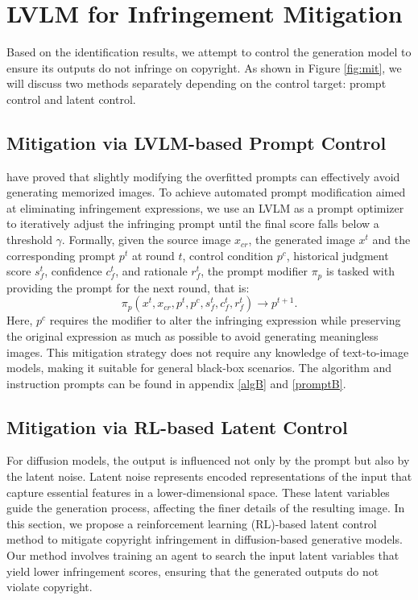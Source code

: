 \section{LVLM for Infringement Mitigation}
\label{mitigation}

Based on the identification results, we attempt to control the generation model to ensure its outputs do not infringe on copyright. As shown in Figure \ref{fig:mit}, we will discuss two methods separately depending on the control target: prompt control and latent control.
\subsection{Mitigation via LVLM-based Prompt Control}
\citeauthor{wen2024detecting} have proved that slightly modifying the overfitted prompts can effectively avoid generating memorized images. To achieve automated prompt modification aimed at eliminating infringement expressions, we use an LVLM as a prompt optimizer to iteratively adjust the infringing prompt until the final score falls below a threshold $\gamma$. Formally, given the source image $x_{{cr}}$, the generated image $x^t$ and the corresponding prompt $p^t$ at round $t$, control condition $p^c$, historical judgment score $s^t_{f}$, confidence $c^t_{f}$, and rationale $r^t_{f}$, the prompt modifier $\pi_{p}$ is tasked with providing the prompt for the next round, that is: 
\begin{equation}
\pi_{p}(x^t, x_{{cr}}, p^t, p^c, s^t_{f}, c^t_{f}, r^t_{f}) \to p^{t+1}.
\end{equation}
Here, $p^c$ requires the modifier to alter the infringing expression while preserving the original expression as much as possible to avoid generating meaningless images. This mitigation strategy does not require any knowledge of text-to-image models, making it suitable for general black-box scenarios. The algorithm and instruction prompts can be found in appendix \ref{algB} and \ref{promptB}.

\subsection{Mitigation via RL-based Latent Control}
For diffusion models, the output is influenced not only by the prompt but also by the latent noise. Latent noise represents encoded representations of the input that capture essential features in a lower-dimensional space. These latent variables guide the generation process, affecting the finer details of the resulting image. In this section, we propose a reinforcement learning (RL)-based latent control method to mitigate copyright infringement in diffusion-based generative models. Our method involves training an agent to search the input latent variables that yield lower infringement scores, ensuring that the generated outputs do not violate copyright.

